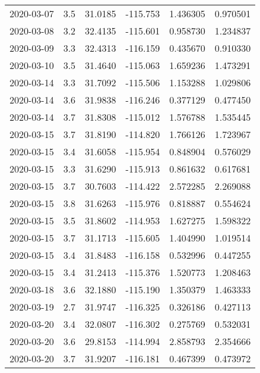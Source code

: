 \begin{tabular}{lrrrrr}
2020-03-07 &       3.5 &  31.0185 &  -115.753 &         1.436305 &         0.970501 \\
2020-03-08 &       3.2 &  32.4135 &  -115.601 &         0.958730 &         1.234837 \\
2020-03-09 &       3.3 &  32.4313 &  -116.159 &         0.435670 &         0.910330 \\
2020-03-10 &       3.5 &  31.4640 &  -115.063 &         1.659236 &         1.473291 \\
2020-03-14 &       3.3 &  31.7092 &  -115.506 &         1.153288 &         1.029806 \\
2020-03-14 &       3.6 &  31.9838 &  -116.246 &         0.377129 &         0.477450 \\
2020-03-14 &       3.7 &  31.8308 &  -115.012 &         1.576788 &         1.535445 \\
2020-03-15 &       3.7 &  31.8190 &  -114.820 &         1.766126 &         1.723967 \\
2020-03-15 &       3.4 &  31.6058 &  -115.954 &         0.848904 &         0.576029 \\
2020-03-15 &       3.3 &  31.6290 &  -115.913 &         0.861632 &         0.617681 \\
2020-03-15 &       3.7 &  30.7603 &  -114.422 &         2.572285 &         2.269088 \\
2020-03-15 &       3.8 &  31.6263 &  -115.976 &         0.818887 &         0.554624 \\
2020-03-15 &       3.5 &  31.8602 &  -114.953 &         1.627275 &         1.598322 \\
2020-03-15 &       3.7 &  31.1713 &  -115.605 &         1.404990 &         1.019514 \\
2020-03-15 &       3.4 &  31.8483 &  -116.158 &         0.532996 &         0.447255 \\
2020-03-15 &       3.4 &  31.2413 &  -115.376 &         1.520773 &         1.208463 \\
2020-03-18 &       3.6 &  32.1880 &  -115.190 &         1.350379 &         1.463333 \\
2020-03-19 &       2.7 &  31.9747 &  -116.325 &         0.326186 &         0.427113 \\
2020-03-20 &       3.4 &  32.0807 &  -116.302 &         0.275769 &         0.532031 \\
2020-03-20 &       3.6 &  29.8153 &  -114.994 &         2.858793 &         2.354666 \\
2020-03-20 &       3.7 &  31.9207 &  -116.181 &         0.467399 &         0.473972 \\

\end{tabular}

